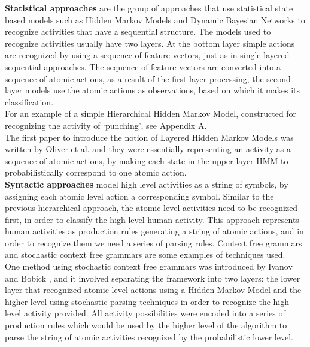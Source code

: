 \documentclass[11pt]{report}
\begin{document}
\textbf{Statistical approaches} are the group of approaches that use statistical state based models such as Hidden Markov Models and Dynamic Bayesian Networks to recognize activities that have a sequential structure. The models used to recognize activities usually have two layers. At the bottom layer simple actions are recognized by using a sequence of feature vectors, just as in single-layered sequential approaches. The sequence of feature vectors are converted into a sequence of atomic actions, as a result of the first layer processing, the second layer models use the atomic actions as observations, based on which it makes its classification. \\
For an example of a simple Hierarchical Hidden Markov Model, constructed for recognizing the activity of `punching', see Appendix A. \\ 
The first paper to introduce the notion of Layered Hidden Markov Models was written by Oliver et al. \cite{layered-HMM} and they were essentially representing an activity as a sequence of atomic actions, by making each state in the upper layer HMM to probabilistically correspond to one atomic action. \\

\textbf{Syntactic approaches} model high level activities as a string of symbols, by assigning each atomic level action a corresponding symbol. Similar to the previous hierarchical approach, the atomic level activities need to be recognized first, in order to classify the high level human activity. This approach represents human activities as production rules generating a string of atomic actions, and in order to recognize them we need a series of parsing rules. Context free grammars and stochastic context free grammars are some examples of techniques used. \\
One method using stochastic context free grammars was introduced by Ivanov and Bobick \cite{ivanov-bobick}, and it involved separating the framework into two layers: the lower layer that recognized atomic level actions using a Hidden Markov Model and the higher level using stochastic parsing techniques in order to recognize the high level activity provided. All activity possibilities were encoded into a series of production rules which would be used by the higher level of the algorithm to parse the string of atomic activities recognized by the probabilistic lower level. \\ 
\end{document}
